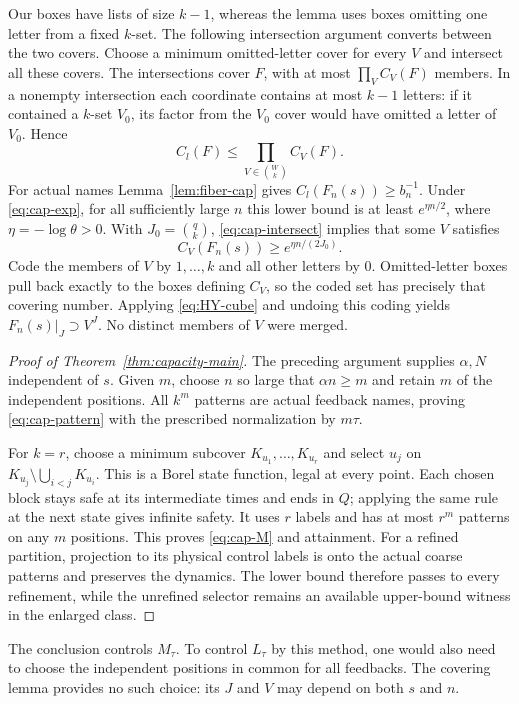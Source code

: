 \documentclass[11pt,reqno]{amsart}
\numberwithin{equation}{section}
\theoremstyle{definition}
\theoremstyle{definition}
\begin{document}
Our boxes have lists of size $k-1$, whereas the lemma uses boxes
omitting one letter from a fixed $k$-set. The following intersection
argument converts between the two covers. Choose a minimum omitted-letter cover for every $V$ and
intersect all these covers. The intersections cover $F$, with at most
$\prod_V C_V(F)$ members. In a nonempty intersection each coordinate
contains at most $k-1$ letters: if it contained a $k$-set $V_0$, its
factor from the $V_0$ cover would have omitted a letter of $V_0$.
Hence
\begin{equation}\label{eq:cap-intersect}
 C_l(F)\le\prod_{V\in\binom Wk}C_V(F).
\end{equation}
For actual names Lemma~\ref{lem:fiber-cap} gives
$C_l(F_n(s))\ge b_n^{-1}$. Under \eqref{eq:cap-exp}, for all
sufficiently large $n$ this lower bound is at least
$e^{\eta n/2}$, where $\eta=-\log\theta>0$. With
$J_0=\binom qk$, \eqref{eq:cap-intersect} implies that some $V$
satisfies
\[
 C_V(F_n(s))\ge e^{\eta n/(2J_0)}.
\]
Code the members of $V$ by $1,\ldots,k$ and all other letters by
$0$. Omitted-letter boxes pull back exactly to the boxes defining
$C_V$, so the coded set has precisely that covering number. Applying
\eqref{eq:HY-cube} and undoing this coding yields
$F_n(s)|_J\supset V^J$. No distinct members of $V$ were merged.

\begin{proof}[Proof of Theorem~\ref{thm:capacity-main}]
The preceding argument supplies $\alpha,N$ independent of $s$.
Given $m$, choose $n$ so large that $\alpha n\ge m$ and retain
$m$ of the independent positions. All $k^m$ patterns are actual
feedback names, proving \eqref{eq:cap-pattern} with the prescribed
normalization by $m\tau$.

For $k=r$, choose a minimum subcover $K_{u_1},\ldots,K_{u_r}$ and
select $u_j$ on $K_{u_j}\setminus\bigcup_{i<j}K_{u_i}$. This is a
Borel state function, legal at every point. Each chosen block stays
safe at its intermediate times and ends in $Q$; applying the same
rule at the next state gives infinite safety. It uses $r$ labels and
has at most $r^m$ patterns on any $m$ positions. This proves
\eqref{eq:cap-M} and attainment. For a refined partition, projection
to its physical control labels is onto the actual coarse patterns
and preserves the dynamics. The lower bound therefore passes to
every refinement, while the unrefined selector remains an available
upper-bound witness in the enlarged class.
\end{proof}

The conclusion controls $M_\tau$. To control $L_\tau$ by this
method, one would also need to choose the independent positions in
common for all feedbacks. The covering lemma provides no such choice:
its $J$ and $V$ may depend on both $s$ and $n$.
\end{document}
